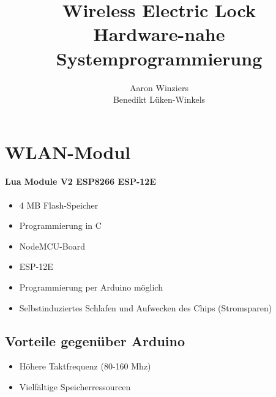 \documentclass{scrartcl}
\title{Wireless Electric Lock\\ \small{Hardware-nahe Systemprogrammierung}}
\author{Aaron Winziers\\Benedikt Lüken-Winkels}
\begin{document}
%
%

\section{WLAN-Modul}
\paragraph{Lua Module V2 ESP8266 ESP-12E}
\begin{itemize}
\item 4 MB Flash-Speicher
\item Programmierung in C
\item NodeMCU-Board
\item ESP-12E
\item Programmierung per Arduino möglich
\item Selbstinduziertes Schlafen und Aufwecken des Chips (Stromsparen)
\end{itemize}


\subsection{Vorteile gegenüber Arduino}

\begin{itemize}
\item Höhere Taktfrequenz (80-160 Mhz)
\item Vielfältige Speicherressourcen
\end{itemize}




\maketitle
\tableofcontents
\newpage



%
%
\end{document}
